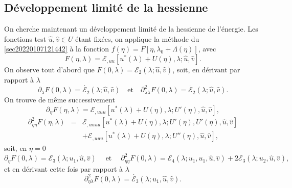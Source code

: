 \documentclass{article}
\newcommand{\tmop}[1]{\ensuremath{\operatorname{#1}}}
\begin{document}
\subsection{D{\'e}veloppement limit{\'e} de la
hessienne}\label{sec20211115081016}

On cherche maintenant un d{\'e}veloppement limit{\'e} de la hessienne de
l'{\'e}nergie. Les fonctions test $\hat{u}, \hat{v} \in U$ {\'e}tant
fix{\'e}es, on applique la m{\'e}thode du
{\textsection}\ref{sec20220107121442} {\`a} la fonction $f (\eta) = F [\eta,
\lambda_0 + \Lambda (\eta)]$, avec
\begin{equation}
  F (\eta, \lambda) =\mathcal{E}_{, u  u} [u^{\ast} (\lambda) + U
  (\eta), \lambda ; \hat{u}, \hat{v}] .
\end{equation}
On observe tout d'abord que $F (0, \lambda) =\mathcal{E}_2 (\lambda ; \hat{u},
\hat{v})$, soit, en d{\'e}rivant par rapport {\`a} $\lambda$
\begin{equation}
  \partial_{\lambda} F (0, \lambda) = \dot{\mathcal{E}_2} (\lambda ; \hat{u},
  \hat{v}) \quad \text{et} \quad \partial_{\lambda  \lambda}^2 F (0,
  \lambda) = \ddot{\mathcal{E}_2} (\lambda ; \hat{u}, \hat{v}) .
\end{equation}
On trouve de m{\^e}me successivement
\begin{equation}
  \partial_{\eta} F (\eta, \lambda) =\mathcal{E}_{, u  u  u}
  [u^{\ast} (\lambda) + U (\eta), \lambda ; U' (\eta), \hat{u}, \hat{v}],
\end{equation}
\begin{eqnarray}
  \partial_{\eta  \eta}^2 F (\eta, \lambda) & = & \mathcal{E}_{, u
   u  u  u} [u^{\ast} (\lambda) + U (\eta), \lambda ;
  U' (\eta), U' (\eta), \hat{u}, \hat{v}] \nonumber\\
  &  & +\mathcal{E}_{, u  u  u} [u^{\ast} (\lambda) + U
  (\eta), \lambda ; U'' (\eta), \hat{u}, \hat{v}],
\end{eqnarray}
soit, en $\eta = 0$
\begin{equation}
  \partial_{\eta} F (0, \lambda) =\mathcal{E}_3 (\lambda ; u_1, \hat{u},
  \hat{v}) \quad \tmop{et} \quad \partial_{\eta  \eta}^2 F (0,
  \lambda) =\mathcal{E}_4 (\lambda ; u_1, u_1, \hat{u}, \hat{v}) +
  2\mathcal{E}_3 (\lambda ; u_2, \hat{u}, \hat{v}),
\end{equation}
et en d{\'e}rivant cette fois par rapport {\`a} $\lambda$
\begin{equation}
  \partial_{\eta  \lambda}^2 F (0, \lambda) = \dot{\mathcal{E}_3}
  (\lambda ; u_1, \hat{u}, \hat{v}) .
\end{equation}
\end{document}
